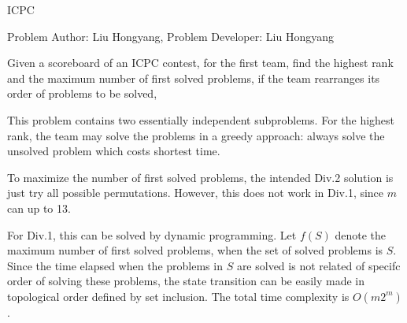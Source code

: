 \begin{Solution}{ICPC}

\begin{frame}{\ProblemName}

\small Problem Author: Liu Hongyang, Problem Developer: Liu Hongyang \par \vspace{0.3cm}

Given a scoreboard of an ICPC contest, for the first team, find the highest rank and the maximum number of first solved problems, if the team rearranges its order of problems to be solved,

\par

This problem contains two essentially independent subproblems. For the highest rank, the team may solve the problems in a greedy approach: always solve the unsolved problem which costs shortest time.

\par

To maximize the number of first solved problems, the intended Div.2 solution is just try all possible permutations. However, this does not work in Div.1, since $m$ can up to 13. 

\end{frame}

\begin{frame}{\ProblemName}

For Div.1, this can be solved by dynamic programming. Let $f(S)$ denote the maximum number of first solved problems, when the set of solved problems is $S$. Since the time elapsed when the problems in $S$ are solved is not related of specifc order of solving these problems, the state transition can be easily made in topological order defined by set inclusion. The total time complexity is $O(m2^m)$.

\end{frame}

\end{Solution}
